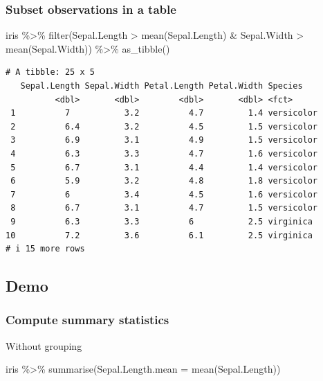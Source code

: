 \documentclass[
  letterpaper,
  DIV=11,
  numbers=noendperiod]{scrartcl}
\newenvironment{Shaded}{\begin{snugshade}}{\end{snugshade}}
\newcommand{\AttributeTok}[1]{\textcolor[rgb]{0.40,0.45,0.13}{#1}}
\newcommand{\FunctionTok}[1]{\textcolor[rgb]{0.28,0.35,0.67}{#1}}
\newcommand{\NormalTok}[1]{\textcolor[rgb]{0.00,0.23,0.31}{#1}}
\newcommand{\SpecialCharTok}[1]{\textcolor[rgb]{0.37,0.37,0.37}{#1}}
\begin{document}
\subsubsection{Subset observations in a
table}\label{subset-observations-in-a-table}

\begin{Shaded}
\begin{Highlighting}[]
\NormalTok{iris }\SpecialCharTok{\%\textgreater{}\%}
    \FunctionTok{filter}\NormalTok{(Sepal.Length }\SpecialCharTok{\textgreater{}} \FunctionTok{mean}\NormalTok{(Sepal.Length) }\SpecialCharTok{\&}\NormalTok{ Sepal.Width }\SpecialCharTok{\textgreater{}} \FunctionTok{mean}\NormalTok{(Sepal.Width)) }\SpecialCharTok{\%\textgreater{}\%}
    \FunctionTok{as\_tibble}\NormalTok{()}
\end{Highlighting}
\end{Shaded}

\begin{verbatim}
# A tibble: 25 x 5
   Sepal.Length Sepal.Width Petal.Length Petal.Width Species   
          <dbl>       <dbl>        <dbl>       <dbl> <fct>     
 1          7           3.2          4.7         1.4 versicolor
 2          6.4         3.2          4.5         1.5 versicolor
 3          6.9         3.1          4.9         1.5 versicolor
 4          6.3         3.3          4.7         1.6 versicolor
 5          6.7         3.1          4.4         1.4 versicolor
 6          5.9         3.2          4.8         1.8 versicolor
 7          6           3.4          4.5         1.6 versicolor
 8          6.7         3.1          4.7         1.5 versicolor
 9          6.3         3.3          6           2.5 virginica 
10          7.2         3.6          6.1         2.5 virginica 
# i 15 more rows
\end{verbatim}

\subsection{Demo}\label{demo-7}

\subsubsection{Compute summary
statistics}\label{compute-summary-statistics}

Without grouping

\begin{Shaded}
\begin{Highlighting}[]
\NormalTok{iris }\SpecialCharTok{\%\textgreater{}\%}
    \FunctionTok{summarise}\NormalTok{(}\AttributeTok{Sepal.Length.mean =} \FunctionTok{mean}\NormalTok{(Sepal.Length))}
\end{Highlighting}
\end{Shaded}
\end{document}

